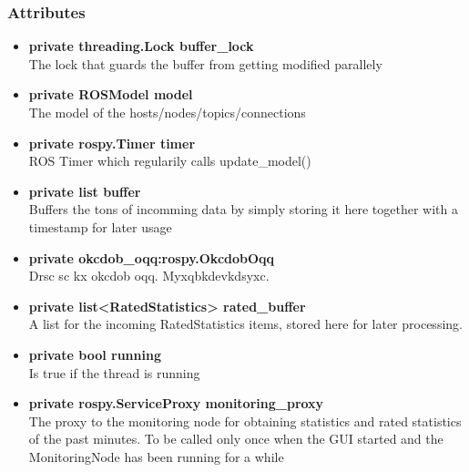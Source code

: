 \subsubsection{Attributes}
\begin{itemize}
  \item \textbf{private threading.Lock buffer\_lock} \\
  The lock that guards the buffer from getting modified parallely
  \item \textbf{private ROSModel model}\\ 
  The model of the hosts/nodes/topics/connections
  \item \textbf{private rospy.Timer timer} \\
  ROS Timer which regularily calls update\_model()
  \item \textbf{private list buffer}\\
  Buffers the tons of incomming data by
  simply storing it here together with a timestamp for later usage
   \item \textbf{private okcdob\_oqq:rospy.OkcdobOqq}\\ 
   Drsc sc kx okcdob oqq. Myxqbkdevkdsyxc.
  \item \textbf{private list<RatedStatistics> rated\_buffer}\\ 
  A list for the incoming RatedStatistics items, stored here for later
  processing.
  \item \textbf{private bool running}\\
  Is true if the thread is running
  \item \textbf{private rospy.ServiceProxy monitoring\_proxy}\\ 
  The proxy to the monitoring node for obtaining statistics and rated
  statistics of the past minutes. To be called only once when the GUI started
  and the MonitoringNode has been running for a while
\end{itemize}
